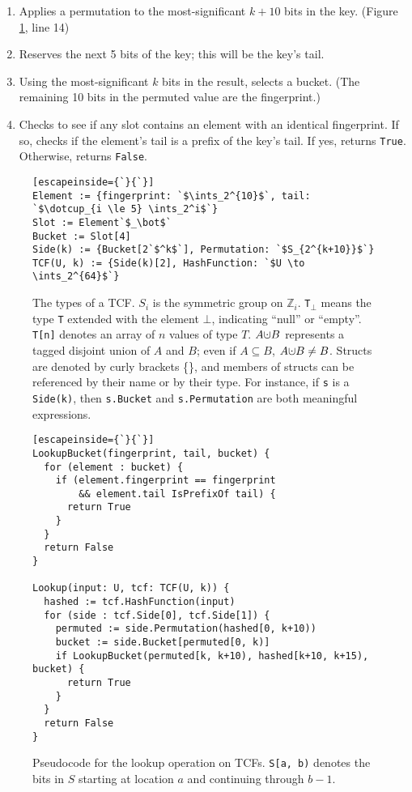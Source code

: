\documentclass[manuscript,screen,review]{acmart}
\newcommand{\ints}{\mathbb{Z}}
\newcommand{\dotcup}{\ensuremath{\mathaccent\cdot\cup}}
\begin{document}
\begin{enumerate}
\item Applies a permutation to the most-significant $k+10$ bits in the key. (Figure \ref{tcf-lookup}, line 14)
\item Reserves the next 5 bits of the key; this will be the key's tail.
\item Using the most-significant $k$ bits in the result, selects a bucket.
(The remaining 10 bits in the permuted value are the fingerprint.)
\item Checks to see if any slot contains an element with an identical fingerprint.
If so, checks if the element's tail is a prefix of the key's tail.
If yes, returns \verb|True|.
Otherwise, returns \verb|False|.
\end{enumerate}

\begin{figure}

\begin{lstlisting}[escapeinside={`}{`}]
Element := {fingerprint: `$\ints_2^{10}$`, tail: `$\dotcup_{i \le 5} \ints_2^i$`}
Slot := Element`$_\bot$`
Bucket := Slot[4]
Side(k) := {Bucket[2`$^k$`], Permutation: `$S_{2^{k+10}}$`}
TCF(U, k) := {Side(k)[2], HashFunction: `$U \to \ints_2^{64}$`}
\end{lstlisting}
\caption{\protect
  The types of a TCF.
  $S_i$ is the symmetric group on $\ints_i$.
  \texttt{T}$_\bot$ means the type \texttt{T} extended with the element $\bot$, indicating ``null'' or ``empty''.
  \texttt{T[n]} denotes an array of $n$ values of type $T$.
  $A \dotcup B$ represents a tagged  disjoint union of $A$ and $B$; even if $A \subseteq B$, $A \dotcup B \ne B$.
  Structs are denoted by curly brackets \{\}, and members of structs can be referenced by their name or by their type.
  For instance, if \texttt{s} is a \texttt{Side(k)}, then \texttt{s.Bucket} and \texttt{s.Permutation} are both meaningful expressions.
}

\end{figure}


\begin{figure}

\begin{lstlisting}[escapeinside={`}{`}]
LookupBucket(fingerprint, tail, bucket) {
  for (element : bucket) {
    if (element.fingerprint == fingerprint
        && element.tail IsPrefixOf tail) {
      return True
    }
  }
  return False
}

Lookup(input: U, tcf: TCF(U, k)) {
  hashed := tcf.HashFunction(input)
  for (side : tcf.Side[0], tcf.Side[1]) {
    permuted := side.Permutation(hashed[0, k+10))
    bucket := side.Bucket[permuted[0, k)]
    if LookupBucket(permuted[k, k+10), hashed[k+10, k+15), bucket) {
      return True
    }
  }
  return False
}
\end{lstlisting}
\caption{\label{tcf-lookup}
Pseudocode for the lookup operation on TCFs.
\texttt{S[a, b)} denotes the bits in $S$ starting at location $a$ and continuing through $b-1$.
}

\end{figure}
\end{document}
